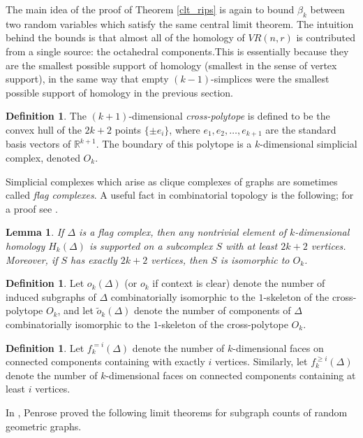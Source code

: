 \documentclass{amsart}
\newtheorem{lemma}[thm]{Lemma}
\theoremstyle{definition}
\newtheorem{definition}[thm]{Definition}
\newcommand{\R}{\mathbb{R}}
\renewcommand{\1}{\mathbb{1}}
\begin{document}
The main idea of the proof of Theorem
\ref{clt_rips} is again to bound $\beta_k$
between two random variables which 
satisfy the same central limit theorem. The intuition behind the bounds is
that almost all of the homology of $VR(n,r)$ is contributed
from a single source: the octahedral components.This is essentially because they
are the smallest possible support of homology (smallest in the sense
of vertex support), in the same way that empty $(k-1)$-simplices
were the smallest possible support of homology in the previous section.

\begin{definition}
The $(k+1)$-dimensional {\it cross-polytope} is
defined to be the convex hull of the $2k+2$ points $\{ \pm e_i
\}$, where $e_1, e_2, \ldots, e_{k+1}$ are the standard basis vectors of
$\R^{k+1}$. The boundary of this polytope is a $k$-dimensional simplicial
complex, denoted $O_{k}$.
\end{definition}

Simplicial complexes which arise as clique complexes of graphs are
sometimes called {\it flag complexes}.  A useful fact in
combinatorial topology is the following; for a proof see
\cite{clique}.

\begin{lemma} \label{octa} 
If $\Delta$ is a flag complex, then any nontrivial element of $k$-dimensional
homology $H_k(\Delta)$ is supported on a subcomplex $S$ with at least
$2k+2$ vertices. Moreover, if $S$ has exactly $2k+2$ vertices, then
$S$ is isomorphic to $O_k$.
\end{lemma}

\begin{definition} 
Let $o_k(\Delta)$ (or $o_k$ if context is clear) denote the number of
induced subgraphs of $\Delta$ 
combinatorially isomorphic to the
$1$-skeleton of the cross-polytope $O_k$, and let $\tilde{o}_k(
\Delta)$ denote the 
number of components of $\Delta$ combinatorially isomorphic to the
$1$-skeleton of the cross-polytope $O_k$.
\end{definition}

\begin{definition} 
Let $f_k^{= i}(\Delta)$ denote the number of $k$-dimensional faces on
connected components containing with exactly $i$ vertices.
Similarly,
let $f_k^{\ge i}(\Delta)$ denote the number of $k$-dimensional faces
on connected components containing at least $i$ vertices.
\end{definition}

In \cite{penrose}, Penrose proved the following 
limit theorems for subgraph counts of random geometric graphs. 
\end{document}

